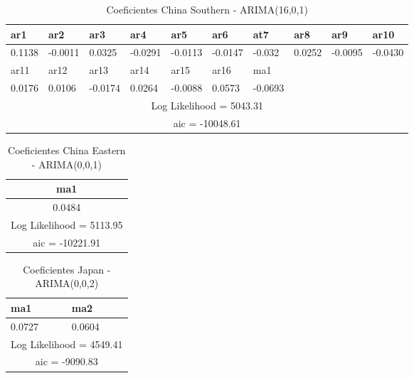 \documentclass[12pt]{article}
\begin{document}
\begin{table}[H]
	\centering
	\begin{tabular}{|l|l|l|l|l|l|l|l|l|l|}
		\hline
		ar1    & ar2     & ar3     & ar4     & ar5     & ar6     & at7     & \multicolumn{1}{l|}{ar8}    & \multicolumn{1}{l|}{ar9}     & \multicolumn{1}{l|}{ar10}    \\ \hline
		0.1138 & -0.0011 & 0.0325  & -0.0291 & -0.0113 & -0.0147 & -0.032  & \multicolumn{1}{l|}{0.0252} & \multicolumn{1}{l|}{-0.0095} & \multicolumn{1}{l|}{-0.0430} \\ \hline
		ar11   & ar12    & ar13    & ar14    & ar15    & ar16    & ma1     &                             &                              &                              \\ \hline
		0.0176 & 0.0106  & -0.0174 & 0.0264  & -0.0088 & 0.0573  & -0.0693 &                             &                              &                              \\ \hline
		\multicolumn{10}{|c|}{Log Likelihood = 5043.31}                                                                                                                \\ \hline
		\multicolumn{10}{|c|}{aic = -10048.61}                                                                                                                         \\ \hline
	\end{tabular}
\caption{Coeficientes China Southern - ARIMA(16,0,1)}
\label{tab:ChinaSouth1601}
\end{table}

\begin{table}[H]
	\centering
	\begin{tabular}{|c|}
		\hline
		ma1                      \\ \hline
		0.0484                   \\ \hline
		Log Likelihood = 5113.95	 \\ \hline
		aic = -10221.91          \\ \hline
	\end{tabular}
	\caption{Coeficientes China Eastern - ARIMA(0,0,1)}
	\label{tab:ChinaEast001}
\end{table}

\begin{table}[H]
	\centering
	\begin{tabular}{|l|l|}
		\hline
		ma1                    & ma2                   \\ \hline
		0.0727                 & 0.0604                \\ \hline
		\multicolumn{2}{|c|}{Log Likelihood = 4549.41} \\ \hline
		\multicolumn{2}{|c|}{aic = -9090.83}           \\ \hline
	\end{tabular}
\caption{Coeficientes Japan - ARIMA(0,0,2)}
\label{tab:Japan002}
\end{table}
\end{document}

